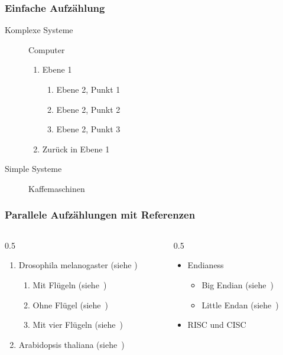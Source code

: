 \documentclass[aspectratio=169,16pt]{beamer}
\begin{document}
\begin{frame}
  \frametitle{Einfache Aufzählung}

  \begin{description}
  \item[Komplexe Systeme] Computer
    \begin{enumerate}
    \item Ebene 1
      \begin{enumerate}
      \item Ebene 2, Punkt 1
      \item Ebene 2, Punkt 2
      \item Ebene 2, Punkt 3
      \end{enumerate}
    \item Zurück in Ebene 1
    \end{enumerate}
  \item[Simple Systeme] Kaffemaschinen
  \end{description}

\end{frame}

\begin{frame}
  \frametitle{Parallele Aufzählungen mit Referenzen}

  \begin{columns}[onlytextwidth]
    \begin{column}{0.5\textwidth}
      \begin{enumerate}
      \item Drosophila melanogaster (siehe \cite{manual})
        \begin{enumerate}
        \item Mit Flügeln (siehe~\cite{article})
        \item Ohne Flügel (siehe~\cite{book})
        \item Mit vier Flügeln (siehe~\cite{booklet})
        \end{enumerate}
      \item Arabidopsis thaliana (siehe~\cite{phdthesis})
      \end{enumerate}
    \end{column}%
    \begin{column}{0.5\textwidth}
      \begin{itemize}
      \item Endianess
        \begin{itemize}
        \item Big Endian (siehe~\cite{conference})
        \item Little Endan (siehe~\cite{inbook})
        \end{itemize}
      \item RISC und CISC
      \end{itemize}
    \end{column}
  \end{columns}
\end{frame}
\end{document}
